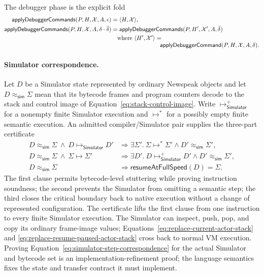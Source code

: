 The debugger phase is the explicit fold
\begin{equation}\label{eq:debugger-command-fold}
\begin{aligned}
 \mathsf{applyDebuggerCommands}(P,H,\mathcal X,A,\epsilon)
   &=\langle H,\mathcal X\rangle,\\
 \mathsf{applyDebuggerCommands}
   (P,H,\mathcal X,A,\delta\cdot\bar\delta)
   &=\mathsf{applyDebuggerCommands}
       (P,H',\mathcal X',A,\bar\delta)\\
 &\quad\text{where }\langle H',\mathcal X'\rangle={}\\[-1mm]
 &\hspace{29mm}\mathsf{applyDebuggerCommand}(P,H,\mathcal X,A,\delta).
\end{aligned}
\end{equation}

\paragraph{Simulator correspondence.}
Let $D$ be a Simulator state represented by ordinary Newspeak objects and let
$D\approx_{\mathsf{sim}}\Sigma$ mean that its bytecode frames and program
counters decode to the stack and control image of
Equation~\eqref{eq:stack-control-image}.  Write
$\longmapsto_{\mathsf{Simulator}}^{+}$ for a nonempty finite Simulator
execution and $\longmapsto^{*}$ for a possibly empty finite semantic
execution.  An admitted compiler/Simulator pair supplies the three-part
certificate
\begin{equation}\label{eq:simulator-step-correspondence}
\begin{aligned}
 D\approx_{\mathsf{sim}}\Sigma\ \land\
 D\longmapsto_{\mathsf{Simulator}}D'
 &\Rightarrow
 \exists\Sigma'.\ \Sigma\longmapsto^{*}\Sigma'
       \land D'\approx_{\mathsf{sim}}\Sigma',\\
 D\approx_{\mathsf{sim}}\Sigma\ \land\ \Sigma\longmapsto\Sigma'
 &\Rightarrow
 \exists D'.\ D\longmapsto_{\mathsf{Simulator}}^{+}D'
       \land D'\approx_{\mathsf{sim}}\Sigma',\\
 D\approx_{\mathsf{sim}}\Sigma
 &\Rightarrow \mathsf{resumeAtFullSpeed}(D)=\Sigma.
\end{aligned}
\end{equation}
The first clause permits bytecode-level stuttering while proving instruction
soundness; the second prevents the Simulator from omitting a semantic step;
the third closes the critical boundary back to native execution without a
change of represented configuration.  The certificate lifts the first clause
from one instruction to every finite Simulator execution.
The Simulator can inspect, push, pop, and copy its ordinary frame-image values;
Equations~\eqref{eq:replace-current-actor-stack} and
\eqref{eq:replace-resume-paused-actor-stack} cross back to normal VM execution.
Proving Equation~\eqref{eq:simulator-step-correspondence} for the actual
Simulator and bytecode set is an implementation-refinement proof; the language
semantics fixes the state and transfer contract it must implement.

